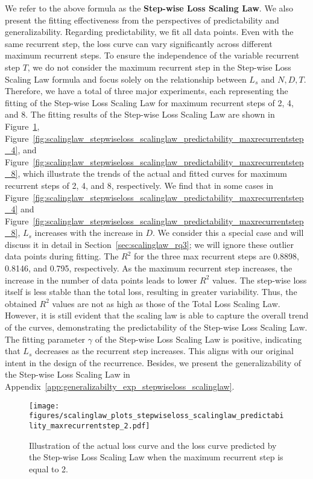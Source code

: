 \documentclass[]{bytedance_seed}
\newcommand{\1}{\mathbf{1}}
\begin{document}
We refer to the above formula as the \textbf{Step-wise Loss Scaling Law}. We also present the fitting effectiveness from the perspectives of predictability and generalizability. Regarding predictability, we fit all data points. 
Even with the same recurrent step, the loss curve can vary significantly across different maximum recurrent steps. To ensure the independence of the variable recurrent step $T$, we do not consider the maximum recurrent step in the Step-wise Loss Scaling Law formula and focus solely on the relationship between $L_s$ and $N,D,T$. 
Therefore, we have a total of three major experiments, each representing the fitting of the Step-wise Loss Scaling Law for maximum recurrent steps of 2, 4, and 8. The fitting results of the Step-wise Loss Scaling Law are shown in Figure~\ref{fig:scalinglaw_stepwiseloss_scalinglaw_predictability_maxrecurrentstep_2}, Figure~\ref{fig:scalinglaw_stepwiseloss_scalinglaw_predictability_maxrecurrentstep_4}, and Figure~\ref{fig:scalinglaw_stepwiseloss_scalinglaw_predictability_maxrecurrentstep_8}, which illustrate the trends of the actual and fitted curves for maximum recurrent steps of 2, 4, and 8, respectively. 
We find that in some cases in Figure~\ref{fig:scalinglaw_stepwiseloss_scalinglaw_predictability_maxrecurrentstep_4} and Figure~\ref{fig:scalinglaw_stepwiseloss_scalinglaw_predictability_maxrecurrentstep_8}, $L_s$ increases with the increase in $D$. We consider this a special case and will discuss it in detail in Section~\ref{sec:scalinglaw_rq3}; we will ignore these outlier data points during fitting. The $R^2$ for the three max recurrent steps are 0.8898, 0.8146, and 0.795, respectively. As the maximum recurrent step increases, the increase in the number of data points leads to lower $R^2$ values. The step-wise loss itself is less stable than the total loss, resulting in greater variability. Thus, the obtained $R^2$ values are not as high as those of the Total Loss Scaling Law. However, it is still evident that the scaling law is able to capture the overall trend of the curves, demonstrating the predictability of the Step-wise Loss Scaling Law.
The fitting parameter $\gamma$ of the Step-wise Loss Scaling Law is positive, indicating that $L_s$ decreases as the recurrent step increases. This aligns with our original intent in the design of the recurrence. Besides, we present the generalizability of the Step-wise Loss Scaling Law in Appendix~\ref{app:generalizabilty_exp_stepwiseloss_scalinglaw}.

\begin{figure}[htbp!]
    \centering
    \texttt{[image: figures/scalinglaw\_plots\_stepwiseloss\_scalinglaw\_predictability\_maxrecurrentstep\_2.pdf]}
    \caption{Illustration of the actual loss curve and the loss curve predicted by the Step-wise Loss Scaling Law when the maximum recurrent step is equal to 2.}
    \label{fig:scalinglaw_stepwiseloss_scalinglaw_predictability_maxrecurrentstep_2}
\end{figure}
\end{document}
